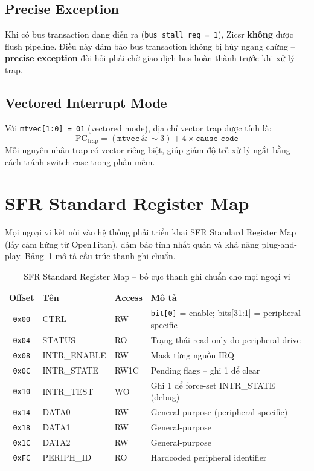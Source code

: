 \subsection{Precise Exception}

Khi có bus transaction đang diễn ra (\texttt{bus\_stall\_req = 1}), Zicsr \textbf{không} được flush pipeline. Điều này đảm bảo bus transaction không bị hủy ngang chừng -- \textbf{precise exception} đòi hỏi phải chờ giao dịch bus hoàn thành trước khi xử lý trap.

\subsection{Vectored Interrupt Mode}

Với \texttt{mtvec[1:0] = 01} (vectored mode), địa chỉ vector trap được tính là:
\begin{equation}
    \text{PC}_{\text{trap}} = (\texttt{mtvec} \, \& \, \sim3) + 4 \times \texttt{cause\_code}
\end{equation}
Mỗi nguyên nhân trap có vector riêng biệt, giúp giảm độ trễ xử lý ngắt bằng cách tránh switch-case trong phần mềm.

\section{SFR Standard Register Map}
\label{sec:sfr-map}

Mọi ngoại vi kết nối vào hệ thống phải triển khai SFR Standard Register Map (lấy cảm hứng từ OpenTitan), đảm bảo tính nhất quán và khả năng plug-and-play. Bảng~\ref{tab:sfr-map} mô tả cấu trúc thanh ghi chuẩn.

\begin{table}[htbp]
\caption{SFR Standard Register Map -- bố cục thanh ghi chuẩn cho mọi ngoại vi}
\label{tab:sfr-map}
\begin{center}
\begin{tabular}{|c|l|l|l|}
\hline
\textbf{Offset} & \textbf{Tên} & \textbf{Access} & \textbf{Mô tả} \\ \hline
\texttt{0x00} & CTRL & RW & \texttt{bit[0]} = enable; bits[31:1] = peripheral-specific \\ \hline
\texttt{0x04} & STATUS & RO & Trạng thái read-only do peripheral drive \\ \hline
\texttt{0x08} & INTR\_ENABLE & RW & Mask từng nguồn IRQ \\ \hline
\texttt{0x0C} & INTR\_STATE & RW1C & Pending flags -- ghi 1 để clear \\ \hline
\texttt{0x10} & INTR\_TEST & WO & Ghi 1 để force-set INTR\_STATE (debug) \\ \hline
\texttt{0x14} & DATA0 & RW & General-purpose (peripheral-specific) \\ \hline
\texttt{0x18} & DATA1 & RW & General-purpose \\ \hline
\texttt{0x1C} & DATA2 & RW & General-purpose \\ \hline
\texttt{0xFC} & PERIPH\_ID & RO & Hardcoded peripheral identifier \\ \hline
\end{tabular}
\end{center}
\end{table}

